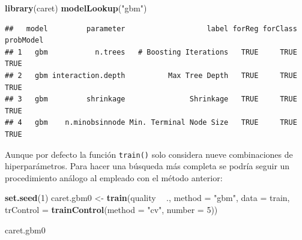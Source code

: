 \documentclass[
]{book}
\newenvironment{Shaded}{\begin{snugshade}}{\end{snugshade}}
\newcommand{\DataTypeTok}[1]{\textcolor[rgb]{0.13,0.29,0.53}{#1}}
\newcommand{\DecValTok}[1]{\textcolor[rgb]{0.00,0.00,0.81}{#1}}
\newcommand{\KeywordTok}[1]{\textcolor[rgb]{0.13,0.29,0.53}{\textbf{#1}}}
\newcommand{\NormalTok}[1]{#1}
\newcommand{\OperatorTok}[1]{\textcolor[rgb]{0.81,0.36,0.00}{\textbf{#1}}}
\newcommand{\StringTok}[1]{\textcolor[rgb]{0.31,0.60,0.02}{#1}}
\theoremstyle{break}
\theoremstyle{definition}
\theoremstyle{definition}
\theoremstyle{definition}
\theoremstyle{remark}
\begin{document}
\begin{Shaded}
\begin{Highlighting}[]
\KeywordTok{library}\NormalTok{(caret)}
\KeywordTok{modelLookup}\NormalTok{(}\StringTok{"gbm"}\NormalTok{)}
\end{Highlighting}
\end{Shaded}

\begin{verbatim}
##   model         parameter                   label forReg forClass probModel
## 1   gbm           n.trees   # Boosting Iterations   TRUE     TRUE      TRUE
## 2   gbm interaction.depth          Max Tree Depth   TRUE     TRUE      TRUE
## 3   gbm         shrinkage               Shrinkage   TRUE     TRUE      TRUE
## 4   gbm    n.minobsinnode Min. Terminal Node Size   TRUE     TRUE      TRUE
\end{verbatim}

Aunque por defecto la función \texttt{train()} solo considera nueve combinaciones de hiperparámetros. Para hacer una búsqueda más completa se podría seguir un procedimiento análogo al empleado con el método anterior:

\begin{Shaded}
\begin{Highlighting}[]
\KeywordTok{set.seed}\NormalTok{(}\DecValTok{1}\NormalTok{)}
\NormalTok{caret.gbm0 <-}\StringTok{ }\KeywordTok{train}\NormalTok{(quality }\OperatorTok{~}\StringTok{ }\NormalTok{., }\DataTypeTok{method =} \StringTok{"gbm"}\NormalTok{, }\DataTypeTok{data =}\NormalTok{ train,}
                   \DataTypeTok{trControl =} \KeywordTok{trainControl}\NormalTok{(}\DataTypeTok{method =} \StringTok{"cv"}\NormalTok{, }\DataTypeTok{number =} \DecValTok{5}\NormalTok{))}
\end{Highlighting}
\end{Shaded}

\begin{Shaded}
\begin{Highlighting}[]
\NormalTok{caret.gbm0}
\end{Highlighting}
\end{Shaded}
\end{document}
